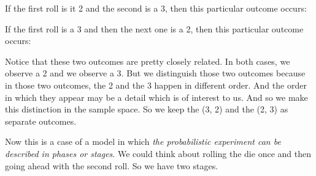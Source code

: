 \documentclass[pdftex, brazil, 12pt, twoside]{article}
\begin{document}
If the first roll is it 2 and the second is a 3, then this
particular outcome occurs:

\begin{figure}[H]
  \begin{center}
  \end{center}
\end{figure}

If the first roll is a 3 and then the next one is a 2, then
this particular outcome occurs:

\begin{figure}[H]
  \begin{center}
  \end{center}
\end{figure}

Notice that these two outcomes are pretty closely related.
In both cases, we observe a 2 and we observe a 3.
But we distinguish those two outcomes because in those two
outcomes, the 2 and the 3 happen in different order.
And the order in which they appear may be a detail which
is of interest to us.
And so we make this distinction
in the sample space.
So we keep the (3, 2) and the (2, 3) as separate outcomes.

Now this is a case of a model in which \emph{the probabilistic
experiment can be described in phases or stages}.
We could think about rolling the die once and then going
ahead with the second roll.
So we have two stages.
\end{document}
